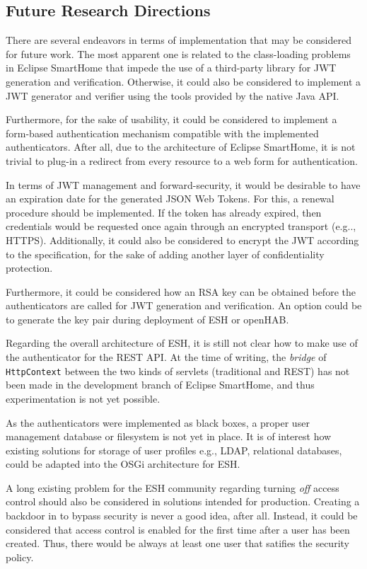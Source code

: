 \documentclass[12pt]{article}
\begin{document}
\subsection{Future Research Directions}

There are several endeavors in terms of implementation that may be considered for future work. The most apparent one is related to the class-loading problems in Eclipse SmartHome that impede the use of a third-party library for JWT generation and verification. Otherwise, it could also be considered to implement a JWT generator and verifier using the tools provided by the native Java API.

Furthermore, for the sake of usability, it could be considered to implement a form-based authentication mechanism compatible with the implemented authenticators. After all, due to the architecture of Eclipse SmartHome, it is not trivial to plug-in a redirect from every resource to a web form for authentication.

In terms of JWT management and forward-security, it would be desirable to have an expiration date for the generated JSON Web Tokens. For this, a renewal procedure should be implemented. If the token has already expired, then credentials would be requested once again through an encrypted transport (e.g.., HTTPS). Additionally, it could also be considered to encrypt the JWT according to the specification, for the sake of adding another layer of confidentiality protection.

Furthermore, it could be considered how an RSA key can be obtained before the authenticators are called for JWT generation and verification. An option could be to generate the key pair during deployment of ESH or openHAB. 

Regarding the overall architecture of ESH, it is still not clear how to make use of the authenticator for the REST API. At the time of writing, the \emph{bridge} of \texttt{HttpContext} between the two kinds of servlets (traditional and REST) has not been made in the development branch of Eclipse SmartHome, and thus experimentation is not yet possible.

As the authenticators were implemented as black boxes, a proper user management database or filesystem is not yet in place. It is of interest how existing solutions for storage of user profiles e.g., LDAP, relational databases, could be adapted into the OSGi architecture for ESH.

A long existing problem for the ESH community regarding turning \emph{off} access control should also be considered in solutions intended for production. Creating a backdoor in to bypass security is never a good idea, after all. Instead, it could be considered that access control is enabled for the first time after a user has been created. Thus, there would be always at least one user that satifies the security policy. 
\end{document}
